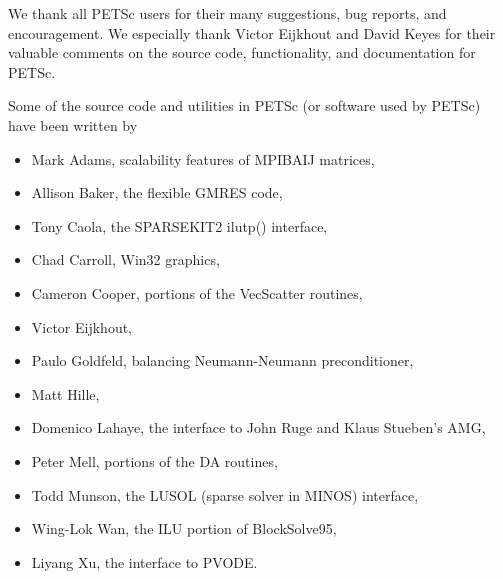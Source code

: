 %
%

\medskip \medskip \noindent
We thank all PETSc users for their many suggestions, bug reports, and
encouragement.  We especially thank Victor Eijkhout and David Keyes
for their valuable comments on the source code,
functionality, and documentation for PETSc.


\vspace{.3in}
\noindent
Some of the source code and utilities in PETSc (or software used by PETSc)
have been written by 
\begin{itemize}
  \item Mark Adams, scalability features of MPIBAIJ matrices,
  \item Allison Baker, the flexible GMRES code,
  \item Tony Caola, the SPARSEKIT2 ilutp() interface,
  \item Chad Carroll, Win32 graphics,
  \item Cameron Cooper, portions of the VecScatter routines, 
  \item Victor Eijkhout,
  \item Paulo Goldfeld, balancing Neumann-Neumann preconditioner,
  \item Matt Hille, 
  \item Domenico Lahaye, the interface to John Ruge and Klaus Stueben's AMG,
  \item Peter Mell, portions of the DA routines,
  \item Todd Munson, the LUSOL (sparse solver in MINOS) interface,
  \item Wing-Lok Wan, the ILU portion of BlockSolve95,
  \item Liyang Xu, the interface to PVODE.
\end{itemize}

